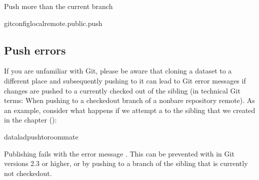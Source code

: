 \begin{findoutmore}[label={fom-push-branch}, before title={\thetcbcounter\ }, float, floatplacement=tb, check odd page=true]{Push more than the current branch}
\begin{sphinxVerbatim}[commandchars=\\\{\}]
gitconfig\PYGZhy{}\PYGZhy{}localremote.public.push
\end{sphinxVerbatim}


\end{findoutmore}


\subsection{Push errors}
\label{\detokenize{basics/101-141-push:pushing-errors}}
\sphinxAtStartPar
If you are unfamiliar with Git, please be aware that cloning a dataset to a different place and subsequently pushing to it can lead to Git error messages if changes are pushed to a currently checked out {\hyperref[\detokenize{glossary:term-branch}]{}} of the sibling (in technical Git terms: When pushing to a checked\sphinxhyphen{}out branch of a non\sphinxhyphen{}bare repository remote).
As an example, consider what happens if we attempt a  to the sibling  that we created in the chapter {\hyperref[\detokenize{basics/basics-collaboration:chapter-collaboration}]{}} ():

\begin{sphinxVerbatim}[commandchars=\\\{\}]
dataladpush\PYGZhy{}\PYGZhy{}toroommate
\end{sphinxVerbatim}

\sphinxAtStartPar
Publishing fails with the error message .
This can be prevented with   in Git versions 2.3 or higher, or by pushing to a branch of the sibling that is currently not checked\sphinxhyphen{}out.

